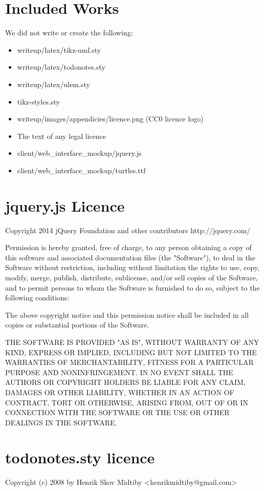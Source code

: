 \section{Included Works}
We did not write or create the following:
\begin{itemize}
\item writeup/latex/tikz-uml.sty
\item writeup/latex/todonotes.sty
\item writeup/latex/ulem.sty
\item tikz-styles.sty
\item writeup/images/appendicies/licence.png (CC0 licence logo)
\item The text of any legal licence
\item client/web\_interface\_mockup/jquery.js
\item client/web\_interface\_mockup/turtles.ttf
\end{itemize}

\section{jquery.js Licence}
Copyright 2014 jQuery Foundation and other contributors
http://jquery.com/

Permission is hereby granted, free of charge, to any person obtaining
a copy of this software and associated documentation files (the
"Software"), to deal in the Software without restriction, including
without limitation the rights to use, copy, modify, merge, publish,
distribute, sublicense, and/or sell copies of the Software, and to
permit persons to whom the Software is furnished to do so, subject to
the following conditions:

The above copyright notice and this permission notice shall be
included in all copies or substantial portions of the Software.

THE SOFTWARE IS PROVIDED "AS IS", WITHOUT WARRANTY OF ANY KIND,
EXPRESS OR IMPLIED, INCLUDING BUT NOT LIMITED TO THE WARRANTIES OF
MERCHANTABILITY, FITNESS FOR A PARTICULAR PURPOSE AND
NONINFRINGEMENT. IN NO EVENT SHALL THE AUTHORS OR COPYRIGHT HOLDERS BE
LIABLE FOR ANY CLAIM, DAMAGES OR OTHER LIABILITY, WHETHER IN AN ACTION
OF CONTRACT, TORT OR OTHERWISE, ARISING FROM, OUT OF OR IN CONNECTION
WITH THE SOFTWARE OR THE USE OR OTHER DEALINGS IN THE SOFTWARE.

\section{todonotes.sty licence}
Copyright (c) 2008 by Henrik Skov Midtiby <henrikmidtiby@gmail.com>

